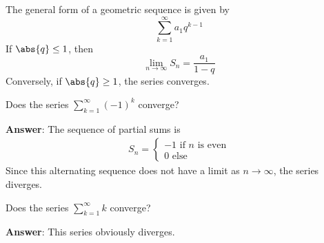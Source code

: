 \begin{exm}\label{exm-sequence-series:2}
	The general form of a geometric sequence is given by
	\begin{equation}\label{eq-geometric-sequence}
		\sum_{k=1}^\infty a_1 q^{k-1}
	\end{equation}
	If $\abs{q}\leq1$, then
	\begin{equation}\label{eq-geometric-series-formula}
		\lim_{n\to\infty} S_n = \frac{a_1}{1-q}
	\end{equation}
	Conversely, if $\abs{q}\geq1$, the series converges.
\end{exm}

\begin{exm}\label{exm-sequence-series:3}
	Does the series $\sum_{k=1}^\infty (-1)^k$ converge?
	\begin{flushleft}
		\textbf{Answer}: The sequence of partial sums is
		\begin{align*}
			S_n = \begin{cases}
				-1\text{ if } n \text{ is even} \\
				0\text{ else}
			\end{cases}
		\end{align*}
		Since this alternating sequence does not have a limit as $n\to\infty$,
		the series diverges.
	\end{flushleft}
\end{exm}


\begin{exm}\label{exm-sequence-series:4}
	Does the series $\sum_{k=1}^\infty k$ converge?
	\begin{flushleft}
		\textbf{Answer}: This series obviously diverges.
	\end{flushleft}
\end{exm}

